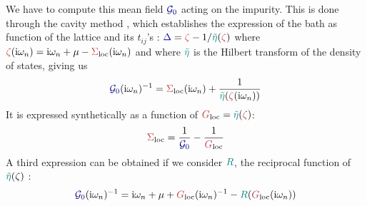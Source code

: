 \documentclass[reprint,amsmath,amssymb,aps,pra]{revtex4-2}
\newcommand{\mathi}{\mathrm{i}}
\newcommand{\iwn}{\mathrm{i}\omega_n}
\begin{document}
We have to compute this mean field ${\color[HTML]{000080}\mathcal{G}_0}$ acting on the impurity. This is done through the cavity method \cite{Georges1996}, which establishes the expression of the bath as function of the lattice and its $t_{ij}$'s : ${\color[HTML]{000080}\Delta} = {\color[HTML]{BF4040}\zeta} - 1/{{\color[HTML]{008080}\tilde{\eta}}
({\color[HTML]{BF4040}\zeta})}$ where ${\color[HTML]{BF4040}\zeta} (\mathi
\omega_n) = \iwn + \mu -{\color[HTML]{BF4040}\Sigma}_{\text{loc}} (\iwn)$ and where ${\color[HTML]{008080}\tilde{\eta}}$ is the Hilbert transform of the density of states, giving us
\begin{equation} {\color[HTML]{000080}\mathcal{G}_0} (\iwn)^{- 1} = 
   {\color[HTML]{BF4040}\Sigma}_{\text{loc}} (\iwn) +
   \frac{1}{{\color[HTML]{008080}\tilde{\eta}} ({\color[HTML]{BF4040}\zeta}
   (\iwn))} \end{equation}
It is expressed synthetically as a function of ${\color[HTML]{BF4040}G}_{\text{loc}} = {\color[HTML]{008080}\tilde{\eta}} ({\color[HTML]{BF4040}\zeta})$:
\begin{equation} {\color[HTML]{BF4040}\Sigma}_{\text{loc}} =
   \frac{1}{{\color[HTML]{000080}\mathcal{G}_0}} -
   \frac{1}{{\color[HTML]{BF4040}G}_{\text{loc}}} \end{equation}
A third expression can be obtained if we consider ${\color[HTML]{008080}R}$, the reciprocal function of ${\color[HTML]{008080}\tilde{\eta}} (\zeta)$ :
\begin{equation}
    {\color[HTML]{000080}\mathcal{G}_0} (\iwn)^{- 1} = \iwn + \mu + {\color[HTML]{BF4040}G}_{\text{loc}} (\iwn)^{- 1} - {\color[HTML]{008080}R} ( {\color[HTML]{BF4040}G}_{\text{loc}} (\iwn) )
    \label{self-consistent-eq-reciproc-Hilbert}
\end{equation}


\end{document}
